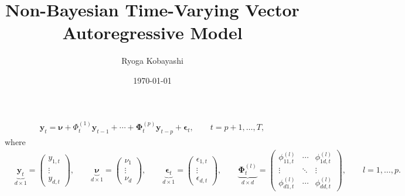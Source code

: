 \documentclass[fleqn]{article}
\title{Non-Bayesian Time-Varying Vector Autoregressive Model}
\date{\today}
\author{Ryoga Kobayashi}
\begin{document}
\maketitle

\begin{align*}
    \bm y_t = \bm \nu + \Phi^{(1)}_{t} \bm y_{t-1} + \cdots + \bm \Phi^{(p)}_{t} \bm y_{t-p} + \bm \epsilon_t, \qquad t = p+1, \dots, T,
\end{align*}
where
\begin{align*}
    & \underbrace{\bm y_t}_{d \times 1} = \begin{pmatrix}
        y_{1, t} \\
        \vdots \\
        y_{d, t}
    \end{pmatrix},
    \qquad
    \underbrace{\bm \nu}_{d \times 1} = \begin{pmatrix}
        \nu_1 \\
        \vdots \\
        \nu_d
    \end{pmatrix},
    \qquad
    \underbrace{\bm \epsilon_t}_{d \times 1} = \begin{pmatrix}
        \epsilon_{1, t} \\
        \vdots \\
        \epsilon_{d, t}
    \end{pmatrix},
    \qquad
    \underbrace{\bm \Phi^{(l)}_t}_{d \times d} = \begin{pmatrix}
        \phi^{(l)}_{11, t} & \cdots & \phi^{(l)}_{1d, t} \\
        \vdots & \ddots & \vdots \\
        \phi^{(l)}_{d1, t} & \cdots & \phi^{(l)}_{dd, t}
    \end{pmatrix},
    \qquad
    l = 1, \dots, p.
\end{align*}
\end{document}
